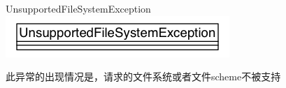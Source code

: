 \begin{XeClass}{UnsupportedFileSystemException}
\includegraphics[width=\textwidth]{cdig/UnsupportedFileSystemException.png}
     
 此异常的出现情况是，请求的文件系统或者文件scheme不被支持

\end{XeClass}
